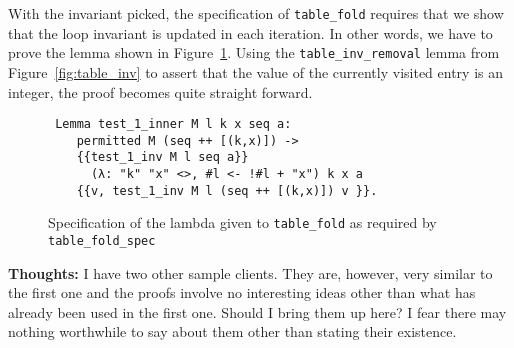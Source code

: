 \documentclass[10pt,a4paper]{article}
\renewcommand{\fcolorbox}[4][]{#4}}
\newcommand{\thoughts}[1]{\noindent\fcolorbox{black}{cyan}{\parbox{\textwidth}{\textbf{Thoughts:} \linebreak #1}}}
\begin{document}
With the invariant picked, the specification of \texttt{table\_fold} requires that we show that the loop invariant is updated in each iteration. In other words, we have to prove the lemma shown in Figure~\ref{fig:test1_inner}. Using the \texttt{table\_inv\_removal} lemma from Figure~\ref{fig:table_inv} to assert that the value of the currently visited entry is an integer, the proof becomes quite straight forward.
\begin{figure}
\begin{verbatim}
 Lemma test_1_inner M l k x seq a:
    permitted M (seq ++ [(k,x)]) ->
    {{test_1_inv M l seq a}}
      (λ: "k" "x" <>, #l <- !#l + "x") k x a 
    {{v, test_1_inv M l (seq ++ [(k,x)]) v }}.
\end{verbatim}
\caption{Specification of the lambda given to \texttt{table\_fold} as required by \texttt{table\_fold\_spec}}
\label{fig:test1_inner}
\end{figure}

\thoughts{I have two other sample clients. They are, however, very similar to the first one and the proofs involve no interesting ideas other than what has already been used in the first one. Should I bring them up here? I fear there may nothing worthwhile to say about them other than stating their existence.}

\printbibliography
\end{document}
